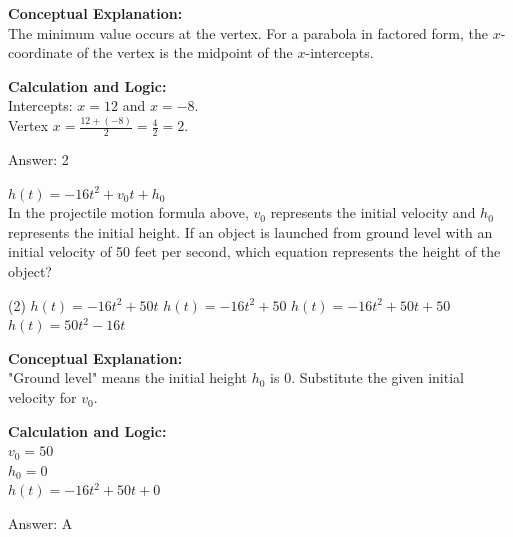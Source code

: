 \documentclass[11pt,paper=a4,answers]{exam}
\begin{document}
\begin{questions}
\begin{solution}
\textbf{Conceptual Explanation:} \\
The minimum value occurs at the vertex. For a parabola in factored form, the $x$-coordinate of the vertex is the midpoint of the $x$-intercepts.

\vspace{20pt}

\textbf{Calculation and Logic:} \\
Intercepts: $x = 12$ and $x = -8$. \\
Vertex $x = \frac{12 + (-8)}{2} = \frac{4}{2} = 2$.

\vspace{25pt}

Answer: \colorbox{yellow!100}{2}
\end{solution}

\vspace{40pt}

\question
$h(t) = -16t^2 + v_0 t + h_0$ \\
In the projectile motion formula above, $v_0$ represents the initial velocity and $h_0$ represents the initial height. If an object is launched from ground level with an initial velocity of 50 feet per second, which equation represents the height of the object?
\begin{tasks}(2)
    \task $h(t) = -16t^2 + 50t$
    \task $h(t) = -16t^2 + 50$
    \task $h(t) = -16t^2 + 50t + 50$
    \task $h(t) = 50t^2 - 16t$
\end{tasks}

\begin{solution}
\textbf{Conceptual Explanation:} \\
"Ground level" means the initial height $h_0$ is 0. Substitute the given initial velocity for $v_0$.

\vspace{20pt}

\textbf{Calculation and Logic:} \\
$v_0 = 50$ \\
$h_0 = 0$ \\
$h(t) = -16t^2 + 50t + 0$

\vspace{25pt}

Answer: \colorbox{yellow!100}{A}
\end{solution}

\vspace{40pt}


\end{questions}
\end{document}
